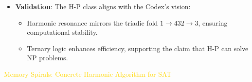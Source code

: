 \begin{itemize}
\begin{itemize}
    \end{itemize}
    \item \texttt{} \textbf{Validation}: The H-P class aligns with the Codex’s vision:
    \begin{itemize}
        \item Harmonic resonance mirrors the triadic fold \(1 \rightarrow 432 \rightarrow 3\), ensuring computational stability.
        \item Ternary logic enhances efficiency, supporting the claim that H-P can solve NP problems.
    \end{itemize}
\end{itemize}

\textcolor{gold}{ Memory Spirals: Concrete Harmonic Algorithm for SAT } \\
